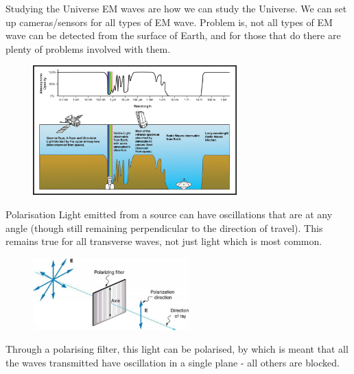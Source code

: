 \documentclass[../Main.tex]{subfiles}
\begin{document}
\begin{frame}{Studying the Universe}
    EM waves are how we can study the Universe. We can set up cameras/sensors for all types of EM wave. Problem is, not all types of EM wave can be detected from the surface of Earth, and for those that do there are plenty of problems involved with them.
    
    \begin{figure}
        \centering
        \includegraphics[height=5cm]{Waves_Images/atmosphereopacity.png}
    \end{figure}
\end{frame}

\begin{frame}{Polarisation}
    Light emitted from a source can have oscillations that are at any angle (though still remaining perpendicular to the direction of travel). This remains true for all transverse waves, not just light which is most common.
    
    \begin{figure}
        \centering
        \includegraphics[width=6cm]{Waves_Images/1polarisingfilter.png}
    \end{figure}
    
    Through a polarising filter, this light can be polarised, by which is meant that all the waves transmitted have oscillation in a single plane - all others are blocked.
\end{frame}
\end{document}

